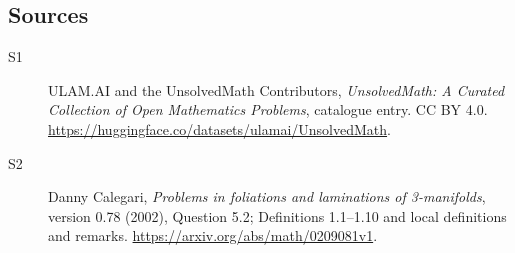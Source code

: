 \documentclass[11pt]{article}
\begin{document}
\subsection{Sources}
\begin{description}
\item[\hypertarget{source:statement:1}{S1}] ULAM.AI and the UnsolvedMath Contributors, \emph{UnsolvedMath: A Curated Collection of Open Mathematics Problems}, catalogue entry. CC BY 4.0. \url{https://huggingface.co/datasets/ulamai/UnsolvedMath}.
\item[\hypertarget{source:statement:2}{S2}] Danny Calegari, \emph{Problems in foliations and laminations of 3-manifolds}, version 0.78 (2002), Question 5.2; Definitions 1.1--1.10 and local definitions and remarks. \url{https://arxiv.org/abs/math/0209081v1}.
\end{description}
\label{end:statement}
\end{document}

